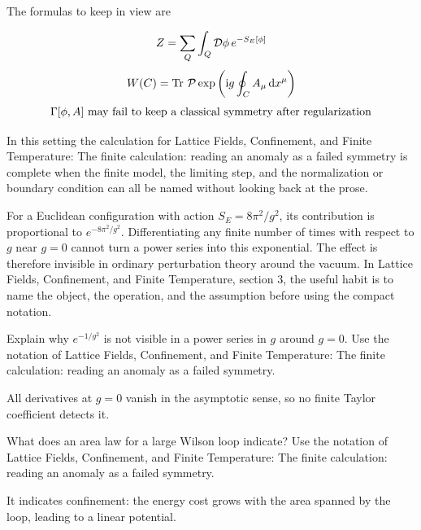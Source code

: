 The formulas to keep in view are

\[
  Z=\sum_Q\int_Q\mathcal D\phi\,e^{-S_E[\phi]}
\]
\[
  W(C)=\operatorname{Tr}\,\mathcal P\exp\left(\mathrm i g\oint_C A_\mu\,\mathrm d x^\mu\right)
\]
\[
  \Gamma[\phi,A]\hbox{ may fail to keep a classical symmetry after regularization}
\]

In this setting the calculation for Lattice Fields, Confinement, and Finite Temperature: The finite calculation: reading an anomaly as a failed symmetry is complete when the finite model, the limiting step, and the normalization or boundary condition can all be named without looking back at the prose.




\begin{example}
For a Euclidean configuration with action \(S_E=8\pi^2/g^2\), its contribution is proportional to \(e^{-8\pi^2/g^2}\).  Differentiating any finite number of times with respect to \(g\) near \(g=0\) cannot turn a power series into this exponential.  The effect is therefore invisible in ordinary perturbation theory around the vacuum.  In Lattice Fields, Confinement, and Finite Temperature, section 3, the useful habit is to name the object, the operation, and the assumption before using the compact notation.
\end{example}



\begin{exercise}
Explain why \(e^{-1/g^2}\) is not visible in a power series in \(g\) around \(g=0\).  Use the notation of Lattice Fields, Confinement, and Finite Temperature: The finite calculation: reading an anomaly as a failed symmetry.
\begin{answer}
All derivatives at \(g=0\) vanish in the asymptotic sense, so no finite Taylor coefficient detects it.
\end{answer}
\end{exercise}

\begin{exercise}
What does an area law for a large Wilson loop indicate?  Use the notation of Lattice Fields, Confinement, and Finite Temperature: The finite calculation: reading an anomaly as a failed symmetry.
\begin{answer}
It indicates confinement: the energy cost grows with the area spanned by the loop, leading to a linear potential.
\end{answer}
\end{exercise}



